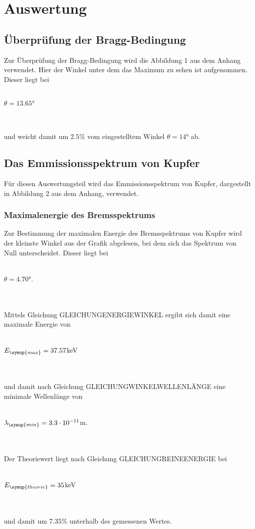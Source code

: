 \section{Auswertung}
\label{sec:Auswertung}

\subsection{Überprüfung der Bragg-Bedingung}
    Zur Überprüfung der Bragg-Bedingung wird die Abbildung 1 aus dem Anhang verwendet. 
    Hier der Winkel unter dem das Maximum zu sehen ist aufgenommen. Dieser liegt bei 
    \\ \\
    \centerline{$\theta = 13.65°$}
    \\ \\
    und weicht damit um $2.5\%$ vom eingestelltem Winkel $\theta = 14°$ ab.



\subsection{Das Emmissionsspektrum von Kupfer}
    Für diesen Auswertungsteil wird das Emmissionsspektrum von Kupfer, dargestellt in Abbildung 2
    aus dem Anhang, verwendet. 
    \subsubsection{Maximalenergie des Bremsspektrums}
        Zur Bestimmung der maximalen Energie des Bremsspektrums von Kupfer wird der kleinste Winkel aus der Grafik abgelesen, bei dem sich 
        das Spektrum von Null unterscheidet. Dieser liegt bei 
        \\ \\
        \centerline{$\theta = 4.70° $.}
        \\ \\
        Mittels Gleichung GLEICHUNGENERGIEWINKEL ergibt sich damit eine maximale Energie von
        \\ \\
        \centerline{$E_{\symup{max}} = 37.57$keV}
        \\ \\ 
        und damit nach Gleichung GLEICHUNGWINKELWELLENLÄNGE eine minimale Wellenlänge von
        \\ \\
        \centerline{$\lambda_{\symup{min}} = 3.3 \cdot 10^{-11}$m.}
        \\ \\
        Der Theoriewert liegt nach Gleichung GLEICHUNGREINEENERGIE bei 
        \\ \\
        \centerline{$E_{\symup{theorie}} = 35$keV}
        \\ \\
        und damit um $7.35 \%$ unterhalb des gemessenen Wertes.

